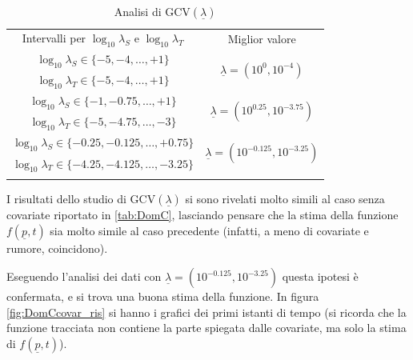 \documentclass[a4paper,11pt,twoside,openright]{book}							%
\begin{document}
\begin{table}[htbp]
\renewcommand{\arraystretch}{1.3}
\setlength{\tabcolsep}{2mm}
\centering
	\begin{tabular}{!{\vrule width 1.2pt}c!{\vrule width 1.2pt}c!{\vrule width 1.2pt}}
	Intervalli per $\log_{10}\lambda_S$ e $\log_{10}\lambda_T$& Miglior valore											\\
	$\log_{10}\lambda_S \in \{-5,-4,\ldots,+1\}$ 	&  			\\
	$\log_{10}\lambda_T \in \{-5,-4,\ldots,+1\}$		& 															\\	
	$\log_{10}\lambda_S \in \{-1,-0.75,\ldots,+1\}$ 	&  		\\
	$\log_{10}\lambda_T \in \{-5,-4.75,\ldots,-3\}$	& 															\\	
	$\log_{10}\lambda_S \in \{-0.25,-0.125,\ldots,+0.75\}$ 	& 	\\
	$\log_{10}\lambda_T \in \{-4.25,-4.125,\ldots,-3.25\}$		& 												\\	
	\end{tabular}
\caption{Analisi di $\mathrm{GCV}(\underline \lambda)$}
\label{tab:DomC_covar}
\end{table}

I risultati dello studio di $\mathrm{GCV}(\underline \lambda)$ si sono rivelati molto simili al caso senza covariate riportato in \ref{tab:DomC}, lasciando pensare che la stima della funzione $f(\underline p,t)$ sia molto simile al caso precedente (infatti, a meno di covariate e rumore, coincidono).

Eseguendo l'analisi dei dati con $\underline \lambda = (10^{-0.125}, 10^{-3.25})$ questa ipotesi è confermata, e si trova una buona stima della funzione. In figura \ref{fig:DomCcovar_ris} si hanno i grafici dei primi istanti di tempo (si ricorda che la funzione tracciata non contiene la parte spiegata dalle covariate, ma solo la stima di $f(\underline p,t)$). 
\end{document}
